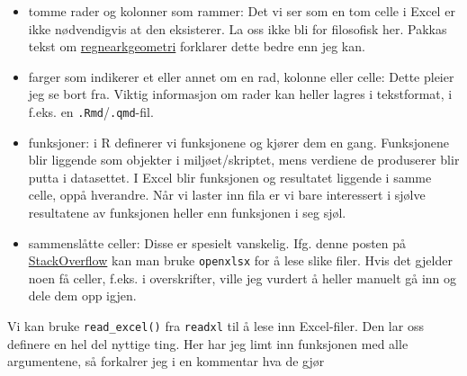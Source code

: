 \documentclass[
  letterpaper,
  DIV=11,
  numbers=noendperiod]{scrreprt}
\providecommand{\tightlist}{%
  \setlength{\itemsep}{0pt}\setlength{\parskip}{0pt}}\usepackage{longtable,booktabs,array}
\begin{document}
\begin{itemize}
\tightlist
\item
  tomme rader og kolonner som rammer: Det vi ser som en tom celle i
  Excel er ikke nødvendigvis at den eksisterer. La oss ikke bli for
  filosofisk her. Pakkas tekst om
  \href{https://readxl.tidyverse.org/articles/sheet-geometry.html}{regnearkgeometri}
  forklarer dette bedre enn jeg kan.
\item
  farger som indikerer et eller annet om en rad, kolonne eller celle:
  Dette pleier jeg se bort fra. Viktig informasjon om rader kan heller
  lagres i tekstformat, i f.eks. en \texttt{.Rmd}/\texttt{.qmd}-fil.
\item
  funksjoner: i R definerer vi funksjonene og kjører dem en gang.
  Funksjonene blir liggende som objekter i miljøet/skriptet, mens
  verdiene de produserer blir putta i datasettet. I Excel blir
  funksjonen og resultatet liggende i samme celle, oppå hverandre. Når
  vi laster inn fila er vi bare interessert i sjølve resultatene av
  funksjonen heller enn funksjonen i seg sjøl.
\item
  sammenslåtte celler: Disse er spesielt vanskelig. Ifg. denne posten på
  \href{https://stackoverflow.com/questions/37509886/how-to-read-merged-excel-cells-with-r}{StackOverflow}
  kan man bruke \texttt{openxlsx} for å lese slike filer. Hvis det
  gjelder noen få celler, f.eks. i overskrifter, ville jeg vurdert å
  heller manuelt gå inn og dele dem opp igjen.
\end{itemize}

Vi kan bruke \texttt{read\_excel()} fra \texttt{readxl} til å lese inn
Excel-filer. Den lar oss definere en hel del nyttige ting. Her har jeg
limt inn funksjonen med alle argumentene, så forkalrer jeg i en
kommentar hva de gjør
\end{document}
